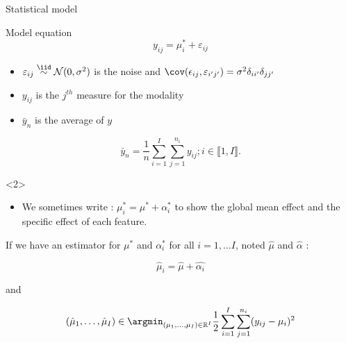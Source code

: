 \documentclass[unknownkeysallowed]{beamer}
\begin{document}
\begin{frame}{Statistical model}
\begin{alertblock}{Model equation}
\[y_{ij}=\mu_i^*+\varepsilon_{ij}\]
\end{alertblock}

\medskip

 \begin{itemize}
        \item $\varepsilon_{ij} \overset{\iid}{\sim} \mathcal{N}(0,\sigma^2) $ is the noise
and $\cov(\epsilon_{ij},\varepsilon_{i'j'})=\sigma^2 \delta_{ii'} \delta_{jj'} $
        \item $y_{ij}$ is the $j^{th}$ measure for the modality
        \item $\bar{y}_n$ is the average of $y$ \ie
    \end{itemize}
 \[
\bar{y}_n= \frac{1}{n} \sum_{i=1}^I \sum_{j=1}^{n_i}y_{ij} ; i\in \llbracket 1,I \rrbracket. \]

\begin{onlyenv}<2>
\begin{itemize}
    \item  We sometimes  write : $\mu^*_i=\mu^*+\alpha^*_i $ to show the global mean effect and the specific effect of each feature.
\end{itemize}
\end{onlyenv}

\end{frame}

\begin{frame}
\rem
If we have an estimator for $\mu^*$ and $\alpha_i^*$ for all $i=1,\dots I$, noted $\hat{\mu}$ and $\hat{\alpha}$ : 

\[\hat{\mu}_i=  \hat{\mu} +  \hat{\alpha_i}  \]

and 

\begin{equation}\label{eq:sep}
(\hat{\mu}_1, \dots, \hat{\mu}_I) \in \argmin_{(\mu_1,\dots,\mu_I)\in \mathbb{R}^I} \frac{1}{2} \sum_{i=1}^I \sum_{j=1}^{n_i}(y_{ij}-\mu_i)^2
\end{equation}

\end{frame}
\end{document}
